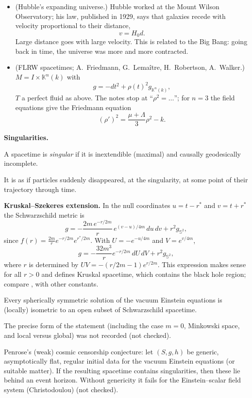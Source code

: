 \begin{itemize}
\item (Hubble's expanding universe.)
Hubble worked at the Mount Wilson
Observatory; his law, published in 1929,
says that galaxies recede with velocity
proportional to their distance,
$$
v=H_0d.
$$
Large distance goes with large velocity.
This is related to the Big Bang: going
back in time, the universe was more and
more contracted.

\item (FLRW spacetimes; A.~Friedmann,
G.~Lemaître, H.~Robertson, A.~Walker.)
$M=I\times\mathbb{K}^n(k)$ with
$$
g=-dt^2+\rho(t)^2g_{\mathbb{K}^n(k)},
$$
$T$ a perfect fluid as above. The notes
stop at ``$\rho^2=\ldots$''; for $n=3$ the
field equations give the Friedmann
equation
$$
\left(\rho'\right)^2
=\frac{\mu+\Lambda}{3}\rho^2-k.
$$
\end{itemize}

\medskip\noindent
{\bf Singularities.}

\begin{definition}
\label{definition-solis-singular}
A spacetime is \emph{singular} if it is
inextendible (maximal) and causally
geodesically incomplete.
\end{definition}

\noindent
It is as if particles suddenly
disappeared, at the singularity, at some
point of their trajectory through time.

\medskip\noindent
{\bf Kruskal--Szekeres extension.} In the
null coordinates $u=t-r^*$ and
$v=t+r^*$ the Schwarzschild metric is
$$
g=-\frac{2m\,e^{-r/2m}}{r}\,
e^{(v-u)/4m}\,du\,dv
+r^2g_{\mathbb{S}^2},
$$
since $f(r)=\frac{2m}{r}e^{-r/2m}
e^{r^*/2m}$. With $U=-e^{-u/4m}$ and
$V=e^{v/4m}$,
$$
g=-\frac{32m^3}{r}e^{-r/2m}\,dU\,dV
+r^2g_{\mathbb{S}^2},
$$
where $r$ is determined by
$UV=-(r/2m-1)e^{r/2m}$. This expression
makes sense for all $r>0$ and defines
Kruskal spacetime, which contains the
black hole region; compare
\cite[Definitions 13.22 and 13.25]{oneill},
with other constants.

\begin{theorem}[Birkhoff, 1923]
\label{theorem-solis-birkhoff}
Every spherically symmetric solution of
the vacuum Einstein equations is
(locally) isometric to an open subset of
Schwarzschild spacetime.
\end{theorem}

\noindent
The precise form of the statement
(including the case $m=0$, Minkowski
space, and local versus global) was not
recorded (not checked).

\begin{remark}[Penrose, 1969]
\label{remark-solis-cosmic-censorship}
Penrose's (weak) cosmic censorship
conjecture: let $(S,g,h)$ be generic,
asymptotically flat, regular initial data
for the vacuum Einstein equations (or
suitable matter). If the resulting
spacetime contains singularities, then
these lie behind an event horizon.
Without genericity it fails for the
Einstein--scalar field system
(Christodoulou) (not checked).
\end{remark}

